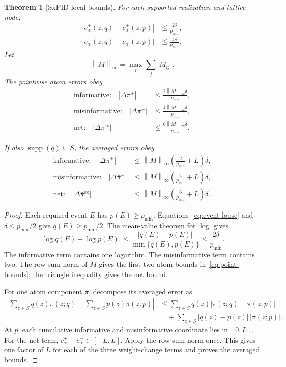 \documentclass[11pt]{article}
\newtheorem{theorem}{Theorem}[section]
\theoremstyle{definition}
\newcommand{\supp}{\operatorname{supp}}
\newcommand{\norminf}[1]{\left\lVert #1\right\rVert_\infty}
\newcommand{\sx}{\mathrm{sx}}
\begin{document}
\begin{theorem}[SxPID local bounds]\label{thm:sx-local}
For each supported realization and lattice node,
\begin{align}
  |c^+_\alpha(z;q)-c^+_\alpha(z;p)|
    &\le \frac{2\delta}{p_{\min}}, \\
  |c^-_\alpha(z;q)-c^-_\alpha(z;p)|
    &\le \frac{4\delta}{p_{\min}}.
\end{align}
Let
\begin{equation}
  \norminf{M}=\max_i\sum_j|M_{ij}|.
\end{equation}
The pointwise atom errors obey
\begin{align}\label{eq:point-bounds}
  \text{informative:}\quad
  |\Delta\pi^+|&\le\frac{2\norminf{M}\delta}{p_{\min}}, \\
  \text{misinformative:}\quad
  |\Delta\pi^-|&\le\frac{4\norminf{M}\delta}{p_{\min}}, \\
  \text{net:}\quad
  |\Delta\pi^\sx|&\le\frac{6\norminf{M}\delta}{p_{\min}}.
\end{align}

If also $\supp(q)\subseteq S$, the averaged errors obey
\begin{align}
  \text{informative:}\quad
  |\Delta\bar\pi^+|&\le\norminf{M}\left(\frac{2}{p_{\min}}+L\right)\delta, \\
  \text{misinformative:}\quad
  |\Delta\bar\pi^-|&\le\norminf{M}\left(\frac{4}{p_{\min}}+L\right)\delta, \\
  \text{net:}\quad
  |\Delta\bar\pi^\sx|&\le\norminf{M}\left(\frac{6}{p_{\min}}+L\right)\delta.
\end{align}
\end{theorem}

\begin{proof}
Each required event $E$ has $p(E)\ge p_{\min}$.  Equations~\eqref{eq:event-loose} and
$\delta\le p_{\min}/2$ give $q(E)\ge p_{\min}/2$.  The mean-value theorem for $\log$ gives
\begin{equation}
  |\log q(E)-\log p(E)|
  \le \frac{|q(E)-p(E)|}{\min\{q(E),p(E)\}}
  \le \frac{2\delta}{p_{\min}}.
\end{equation}
The informative term contains one logarithm.  The misinformative term contains two.  The row-sum
norm of $M$ gives the first two atom bounds in~\eqref{eq:point-bounds}; the triangle inequality
gives the net bound.

For one atom component $\pi$, decompose its averaged error as
\begin{align}
  \left|\sum_{z\in S}q(z)\pi(z;q)-\sum_{z\in S}p(z)\pi(z;p)\right|
  &\le \sum_{z\in S}q(z)|\pi(z;q)-\pi(z;p)| \\
  &\quad +\sum_{z\in S}|q(z)-p(z)|\,|\pi(z;p)|.
\end{align}
At $p$, each cumulative informative and misinformative coordinate lies in $[0,L]$.  For the net
term, $c^+_\alpha-c^-_\alpha\in[-L,L]$.  Apply the row-sum norm once.  This gives one factor of $L$
for each of the three weight-change terms and proves the averaged bounds.
\end{proof}
\end{document}
